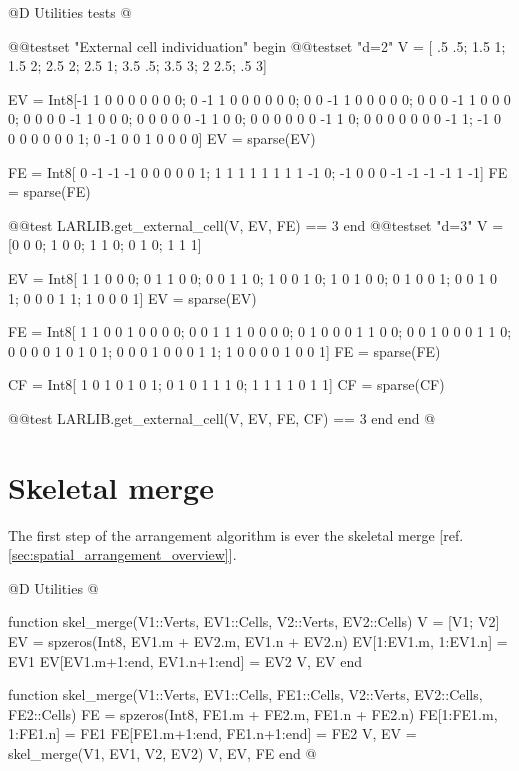 @D Utilities tests
@{@@testset "External cell individuation" begin
    @@testset "d=2"
        V = [ .5 .5;  1.5   1;  1.5  2; 
            2.5  2;  2.5   1;  3.5 .5;
            3.5  3;    2 2.5;   .5  3]

        EV = Int8[-1  1  0  0  0  0  0  0  0;
                0 -1  1  0  0  0  0  0  0;
                0  0 -1  1  0  0  0  0  0;
                0  0  0 -1  1  0  0  0  0;
                0  0  0  0 -1  1  0  0  0;
                0  0  0  0  0 -1  1  0  0;
                0  0  0  0  0  0 -1  1  0;
                0  0  0  0  0  0  0 -1  1;
                -1  0  0  0  0  0  0  0  1;
                0 -1  0  0  1  0  0  0  0]
        EV = sparse(EV)
        
        FE = Int8[ 0 -1 -1 -1  0  0  0  0  0  1;
                1  1  1  1  1  1  1  1 -1  0;
                -1  0  0  0 -1 -1 -1 -1  1 -1]
        FE = sparse(FE)

        @@test LARLIB.get_external_cell(V, EV, FE) == 3
    end
    @@testset "d=3"
        V = [0 0 0; 1 0 0; 1 1 0; 0 1 0; 1 1 1] 

        EV = Int8[
            1 1 0 0 0;
            0 1 1 0 0;
            0 0 1 1 0;
            1 0 0 1 0;
            1 0 1 0 0;
            0 1 0 0 1;
            0 0 1 0 1;
            0 0 0 1 1;
            1 0 0 0 1]
        EV = sparse(EV)
        
        FE = Int8[
            1 1 0 0 1 0 0 0 0;
            0 0 1 1 1 0 0 0 0;
            0 1 0 0 0 1 1 0 0;
            0 0 1 0 0 0 1 1 0;
            0 0 0 0 1 0 1 0 1;
            0 0 0 1 0 0 0 1 1;
            1 0 0 0 0 1 0 0 1]
        FE = sparse(FE)

        CF = Int8[
            1 0 1 0 1 0 1;
            0 1 0 1 1 1 0;
            1 1 1 1 0 1 1]
        CF = sparse(CF)

        @@test LARLIB.get_external_cell(V, EV, FE, CF) == 3
    end
end
@}



\section{Skeletal merge}
\label{sec:skel_merge}

The first step of the arrangement algorithm is ever
the skeletal merge [ref. \ref{sec:spatial_arrangement_overview}].

@D Utilities
@{function skel_merge(V1::Verts, EV1::Cells, V2::Verts, EV2::Cells)
    V = [V1; V2]
    EV = spzeros(Int8, EV1.m + EV2.m, EV1.n + EV2.n)
    EV[1:EV1.m, 1:EV1.n] = EV1
    EV[EV1.m+1:end, EV1.n+1:end] = EV2
    V, EV
end

function skel_merge(V1::Verts, EV1::Cells, FE1::Cells, V2::Verts, EV2::Cells, FE2::Cells)
    FE = spzeros(Int8, FE1.m + FE2.m, FE1.n + FE2.n)
    FE[1:FE1.m, 1:FE1.n] = FE1
    FE[FE1.m+1:end, FE1.n+1:end] = FE2
    V, EV = skel_merge(V1, EV1, V2, EV2)
    V, EV, FE
end
@}

